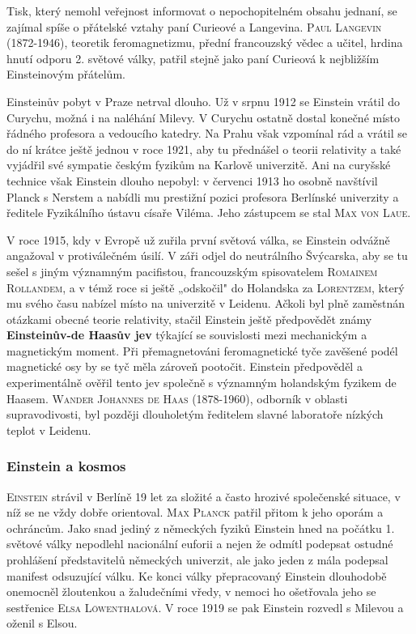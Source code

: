         Tisk, který nemohl veřejnost informovat o nepochopitelném obsahu jednaní, se zajímal spíše o
        přátelské vztahy paní Curieové a Langevina. \textsc{Paul Langevin} (1872-1946), teoretik
        feromagnetizmu, přední francouzský vědec a učitel, hrdina hnutí odporu 2. světové války,
        patřil stejně jako paní Curieová k nejbližším Einsteinovým přátelům.

        Einsteinův pobyt v Praze netrval dlouho. Už v srpnu 1912 se Einstein vrátil do Curychu,
        možná i na naléhání Milevy. V Curychu ostatně dostal konečné místo řádného profesora a
        vedoucího katedry. Na Prahu však vzpomínal rád a vrátil se do ní krátce ještě jednou v roce
        1921, aby tu přednášel o teorii relativity a také vyjádřil své sympatie českým fyzikům na
        Karlově univerzitě. Ani na curyšské technice však Einstein dlouho nepobyl: v červenci 1913
        ho osobně navštívil Planck s Nerstem a nabídli mu prestižní pozici profesora Berlínské
        univerzity a ředitele Fyzikálního ústavu císaře Viléma. Jeho zástupcem se stal \textsc{Max
        von Laue}.

        V roce 1915, kdy v Evropě už zuřila první světová válka, se Einstein odvážně angažoval v
        protiválečném úsilí. V záři odjel do neutrálního Švýcarska, aby se tu sešel s jiným
        významným pacifistou, francouzským spisovatelem \textsc{Romainem Rollandem}, a v témž roce
        si ještě „odskočil" do Holandska za \textsc{Lorentzem}, který mu svého času nabízel místo na
        univerzitě v Leidenu. Ačkoli byl plně zaměstnán otázkami obecné teorie relativity, stačil
        Einstein ještě předpovědět známy \textbf{Einsteinův-de Haasův jev} týkající se souvislosti
        mezi mechanickým a magnetickým moment. Při přemagnetováni feromagnetické tyče zavěšené podél
        magnetické osy by se tyč měla zároveň pootočit. Einstein předpověděl a experimentálně ověřil
        tento jev společně s významným holandským fyzikem de Haasem. \textsc{Wander Johannes de
        Haas} (1878-1960), odborník v oblasti supravodivosti, byl později dlouholetým ředitelem
        slavné laboratoře nízkých teplot v Leidenu.

      \subsubsection{Einstein a kosmos}
        \textsc{Einstein} strávil v Berlíně 19 let za složité a často hrozivé společenské situace, v
        níž se ne vždy dobře orientoval. \textsc{Max Planck} patřil přitom k jeho oporám a
        ochráncům. Jako snad jediný z německých fyziků Einstein hned na počátku 1. světové války
        nepodlehl nacionální euforii a nejen že odmítl podepsat ostudné prohlášení představitelů
        německých univerzit, ale jako jeden z mála podepsal manifest odsuzující válku. Ke konci
        války přepracovaný Einstein dlouhodobě onemocněl žloutenkou a žaludečními vředy, v nemoci ho
        ošetřovala jeho se sestřenice \textsc{Elsa Löwenthalová}. V roce 1919 se pak Einstein
        rozvedl s Milevou a oženil s Elsou.

